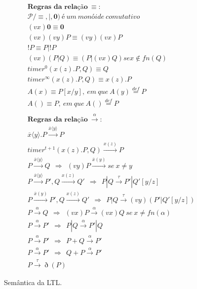 \begin{figure}[ht]
	\centering
	\begin{align}
		&\textbf{Regras~da~relação}~\equiv: \nonumber \\
		& \mathcal{P}/ \equiv, |, \textbf{0})~é~um~monóide~comutativo \\
		& (vx)\textbf{0} \equiv \textbf{0} \\
		& (vx)(vy)P \equiv (vy)(vx)P \\
		& !P \equiv P|!P \\
		& (vx)(P|Q) \equiv (P|(vx)Q) se x \notin fn(Q) \\ 
		& timer^{0}(x(z).P,Q) \equiv Q \label{eq:6} \\ 
		& timer^{\infty}(x(z).P,Q) \equiv x(z).P \label{eq:7} \\
		& A(x) \equiv P[x/y],~em~que~A(y) \stackrel{def}{=} P \label{eq:8} \\
		& A() \equiv P,~em~que~A() \stackrel{def}{=} P \label{eq:9} \\
		& \nonumber \\
		&\textbf{Regras~da~relação}~\stackrel{\alpha}{\longrightarrow}: \nonumber \\
		& \overline{x}\langle y \rangle.P \stackrel{\overline{x}\langle y \rangle}{\longrightarrow} P \\		
		& timer^{t+1}(x(z).P,Q) \stackrel{x(z)}{\longrightarrow} P \\
		& P \stackrel{\overline{x}\langle y \rangle}{\longrightarrow} Q ~~ \Rightarrow ~~ (vy)P \stackrel{\overline{x}(y)}{\longrightarrow} se~ x \neq y \\
		& P \stackrel{\overline{x}\langle y \rangle}{\longrightarrow} P', Q \stackrel{x(z)}{\longrightarrow} Q' ~~ \Rightarrow ~~ P|Q \stackrel{\tau}{\longrightarrow} P' | Q'[y/z] \\
		& P \stackrel{\overline{x}(y)}{\longrightarrow} P', Q \stackrel{x(z)}{\longrightarrow} Q' ~~ \Rightarrow ~~ P|Q \stackrel{\tau}{\longrightarrow} (vy)(P'|Q'[y/z]) \\
		& P \stackrel{\alpha}{\longrightarrow} Q ~~ \Rightarrow ~~ (vx)P \stackrel{\alpha}{\longrightarrow} (vx)Q~se~ x \neq fn(\alpha) \\
		& P \stackrel{\alpha}{\longrightarrow} P' ~~ \Rightarrow ~~ P|Q \stackrel{\alpha}{\longrightarrow} P'|Q \\
		& P \stackrel{\alpha}{\longrightarrow} P' ~~ \Rightarrow ~~ P + Q\stackrel{\alpha}{\longrightarrow} P' \\
		& P \stackrel{\alpha}{\longrightarrow} P' ~~ \Rightarrow ~~ Q + P\stackrel{\alpha}{\longrightarrow} P' \\ \label{eq:19}
		& P \stackrel{\tau}{\longrightarrow} \eth  (P)
	\end{align}
	\caption{Semântica da LTL.
		\label{fig:ltl_sema}}
\end{figure}
\FloatBarrier



